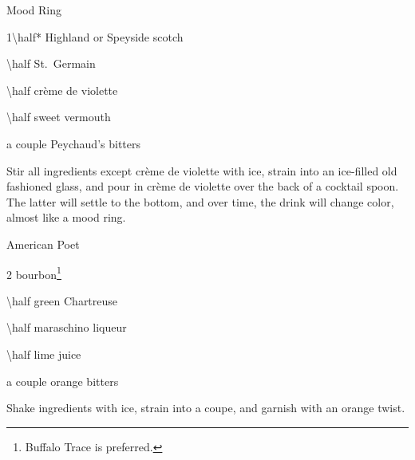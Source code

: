 \begin{Cocktail*}{Mood Ring} %
	\begin{Ingredients}
	\item \SI{1\half*}{\oz} Highland or Speyside scotch
	\item \SI{\half}{\oz} St.\ Germain
	\item \SI{\half}{\oz} cr\`eme de violette
	\item \SI{\half}{\oz} sweet vermouth
	\item a couple \si{\dashes} Peychaud's bitters
	\end{Ingredients}
	
	\begin{Instructions}\small
	Stir all ingredients except cr\`eme de violette with ice, strain into an ice-filled old fashioned glass, and pour in cr\`eme de violette over the back of a cocktail spoon.  The latter will settle to the bottom, and over time, the drink will change color, almost like a mood ring.
	\end{Instructions}
\end{Cocktail*}

\begin{Cocktail}{American Poet}
	\begin{Ingredients}
	\item \SI{2}{\oz} bourbon\footnote{Buffalo Trace is preferred.}
	\item \SI{\half}{\oz} green Chartreuse
	\item \SI{\half}{\oz} maraschino liqueur
	\item \SI{\half}{\oz} lime juice
	\item a couple \si{\dashes} orange bitters
	\end{Ingredients}
	
	\begin{Instructions}
	Shake ingredients with ice, strain into a coupe, and garnish with an orange twist.
	\end{Instructions}
\end{Cocktail}

